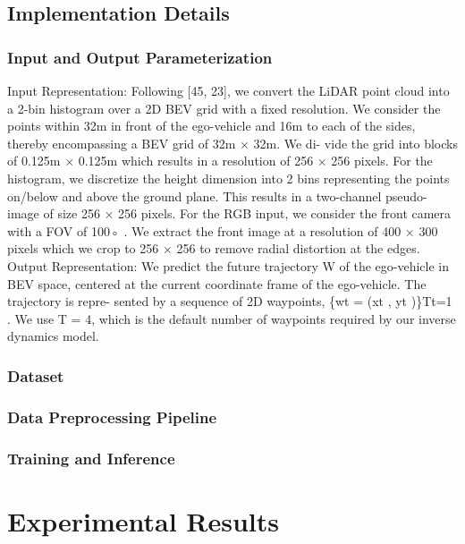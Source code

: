 \documentclass[letterpaper, 12pt]{article}
\theoremstyle{definition}
\theoremstyle{definition}
\theoremstyle{definition}
\theoremstyle{definition}
\theoremstyle{definition}
\begin{document}
\subsection{Implementation Details}
\label{sec:orgf2fccd9}

\subsubsection{Input and Output Parameterization}
\label{sec:org80afd59}
Input Representation: Following [45, 23], we convert the
LiDAR point cloud into a 2-bin histogram over a 2D BEV
grid with a fixed resolution. We consider the points within
32m in front of the ego-vehicle and 16m to each of the sides,
thereby encompassing a BEV grid of 32m × 32m. We di-
vide the grid into blocks of 0.125m × 0.125m which results
in a resolution of 256 × 256 pixels. For the histogram, we
discretize the height dimension into 2 bins representing the
points on/below and above the ground plane. This results in
a two-channel pseudo-image of size 256 × 256 pixels. For
the RGB input, we consider the front camera with a FOV
of 100◦ . We extract the front image at a resolution of 400
× 300 pixels which we crop to 256 × 256 to remove radial
distortion at the edges.
Output Representation: We predict the future trajectory
W of the ego-vehicle in BEV space, centered at the current
coordinate frame of the ego-vehicle. The trajectory is repre-
sented by a sequence of 2D waypoints, \{wt = (xt , yt )\}Tt=1 .
We use T = 4, which is the default number of waypoints
required by our inverse dynamics model.

\subsubsection{Dataset}
\label{sec:org727e443}

\subsubsection{Data Preprocessing Pipeline \label{org0ab9e19}}
\label{sec:org1df56e0}


\subsubsection{Training and Inference}
\label{sec:orgbe4e60a}

\section{Experimental Results \label{org68ea1bd}}
\label{sec:orgc16c6aa}
\end{document}
